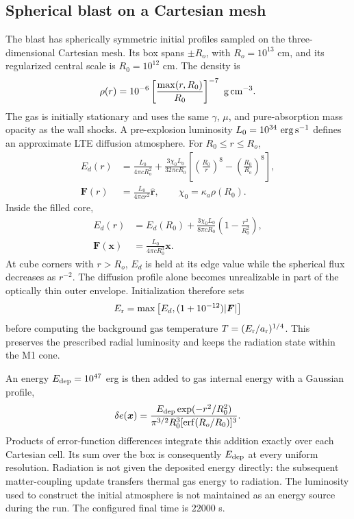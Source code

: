 \documentclass[manuscript]{aastex7}
\newcommand{\vct}[1]{\boldsymbol{#1}}
\newcommand{\Er}{E_{\rm r}}
\newcommand{\Fr}{\vct{F}}
\newcommand{\ar}{a_{\rm r}}
\begin{document}
\subsection{Spherical blast on a Cartesian mesh}
The blast has spherically symmetric initial profiles sampled on the
three-dimensional Cartesian mesh. Its box spans $\pm R_o$, with
$R_o=10^{13}$ cm, and its regularized central scale is $R_0=10^{12}$ cm.
The density is
\begin{equation}
 \rho(r)=10^{-6}
 \left[\frac{\max(r,R_0)}{R_0}\right]^{-7}
              \ {\rm g\,cm^{-3}}.
 \label{eq:blastdensity}
\end{equation}
The gas is initially stationary and uses the same $\gamma$, $\mu$, and
pure-absorption mass opacity as the wall shocks. A pre-explosion
luminosity $L_0=10^{34}\ {\rm erg\,s^{-1}}$ defines an approximate LTE
diffusion atmosphere. For $R_0\leq r\leq R_o$,
\begin{align}
 E_d(r)&=\frac{L_0}{4\pi cR_o^2}
 +\frac{3\chi_0L_0}{32\pi cR_0}
       \left[\left(\frac{R_0}{r}\right)^8
                   -\left(\frac{R_0}{R_o}\right)^8\right],\\
 \Fr(r)&=\frac{L_0}{4\pi c r^2}\hat{\vct{r}},
 \qquad \chi_0=\kappa_a\rho(R_0).
 \label{eq:blastenvelope}
\end{align}
Inside the filled core,
\begin{align}
 E_d(r)&=E_d(R_0)+\frac{3\chi_0L_0}{8\pi cR_0}
                              \left(1-\frac{r^2}{R_0^2}\right),\\
 \Fr(\vct{x})&=\frac{L_0}{4\pi c R_0^3}\vct{x}.
\end{align}
At cube corners with $r>R_o$, $E_d$ is held at its edge value while the
spherical flux decreases as $r^{-2}$. The diffusion profile alone becomes
unrealizable in part of the optically thin outer envelope. Initialization
therefore sets
\begin{equation}
 \Er=\max\left[E_d,(1+10^{-12})|\Fr|\right]
\end{equation}
before computing the background gas temperature
$T=(\Er/\ar)^{1/4}$. This preserves the prescribed radial luminosity and
keeps the radiation state within the M1 cone.

An energy $E_{\rm dep}=10^{47}$ erg is then added to gas internal energy
with a Gaussian profile,
\begin{equation}
 \delta e(\vct{x})=
 \frac{E_{\rm dep}\exp(-r^2/R_0^2)}
 {\pi^{3/2}R_0^3[\operatorname{erf}(R_o/R_0)]^3}.
 \label{eq:blastdeposit}
\end{equation}
Products of error-function differences integrate this addition exactly
over each Cartesian cell. Its sum over the box is consequently
$E_{\rm dep}$ at every uniform resolution. Radiation is not given the
deposited energy directly: the subsequent matter-coupling update transfers
thermal gas energy to radiation. The luminosity used to construct the
initial atmosphere is not maintained as an energy source during the run.
The configured final time is $22000$ s.
\end{document}
